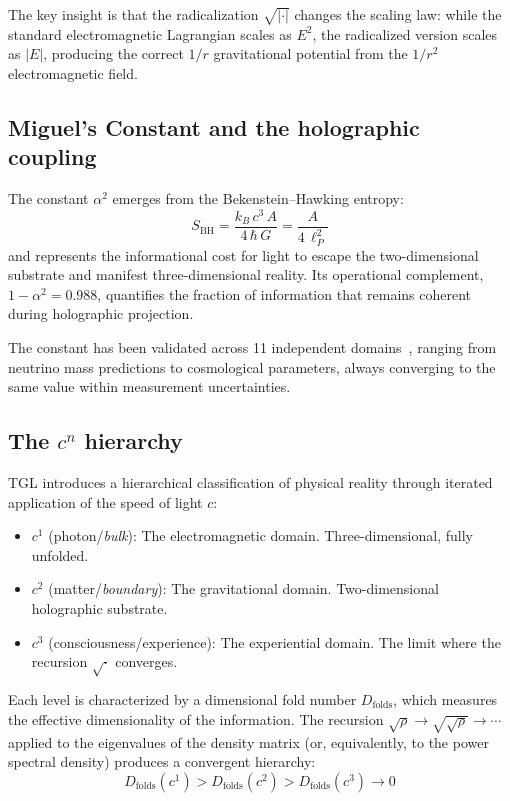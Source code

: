 \documentclass[12pt,a4paper,twocolumn]{article}
\newcommand{\alphaii}{\alpha^{2}}
\newcommand{\boundary}{\textit{boundary}}
\newcommand{\bulk}{\textit{bulk}}
\newcommand{\Dfolds}{D_{\text{folds}}}
\begin{document}
The key insight is that the radicalization $\sqrt{|\cdot|}$ changes the scaling law: while the standard electromagnetic Lagrangian scales as $E^2$, the radicalized version scales as $|E|$, producing the correct $1/r$ gravitational potential from the $1/r^2$ electromagnetic field.

\subsection{Miguel's Constant and the holographic coupling}

The constant $\alphaii$ emerges from the Bekenstein--Hawking entropy:
\begin{equation}
S_{\text{BH}} = \frac{k_B\,c^3\,A}{4\,\hbar\,G} = \frac{A}{4\,\ell_P^2}
\end{equation}
and represents the informational cost for light to escape the two-dimensional substrate and manifest three-dimensional reality. Its operational complement, $1 - \alphaii = 0.988$, quantifies the fraction of information that remains coherent during holographic projection.

The constant has been validated across 11 independent domains~\cite{Miguel2026Fronteira}, ranging from neutrino mass predictions to cosmological parameters, always converging to the same value within measurement uncertainties.

\subsection{The $c^n$ hierarchy}

TGL introduces a hierarchical classification of physical reality through iterated application of the speed of light $c$:

\begin{itemize}[nosep]
\item $c^1$ (photon/\bulk): The electromagnetic domain. Three-dimensional, fully unfolded.
\item $c^2$ (matter/\boundary): The gravitational domain. Two-dimensional holographic substrate.
\item $c^3$ (consciousness/experience): The experiential domain. The limit where the recursion $\sqrt{\cdot}$ converges.
\end{itemize}

Each level is characterized by a dimensional fold number $\Dfolds$, which measures the effective dimensionality of the information. The recursion $\sqrt{\rho} \to \sqrt{\sqrt{\rho}} \to \cdots$ applied to the eigenvalues of the density matrix (or, equivalently, to the power spectral density) produces a convergent hierarchy:
\begin{equation}
\label{eq:hierarchy}
\Dfolds(c^1) > \Dfolds(c^2) > \Dfolds(c^3) \to 0
\end{equation}
\end{document}
